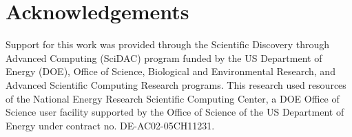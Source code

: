 \documentclass[review,oneside]{igs}
\begin{document}


\section{Acknowledgements}
Support for this work was provided through the Scientific Discovery through Advanced Computing (SciDAC) program funded by the US Department of Energy (DOE), Office of Science, Biological and Environmental Research, and Advanced Scientific Computing Research programs. This research used resources of the National Energy Research Scientific Computing Center, a DOE Office of Science user facility supported by the Office of Science of the US Department of Energy under contract no. DE-AC02-05CH11231.





\end{document}
